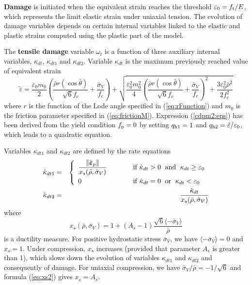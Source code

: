 \documentclass[a4paper]{article}
\begin{document}
{\bf Damage} is initiated when the equivalent strain reaches the threshold $\varepsilon_{0} = f_{\rm t}/E$,
which represents the limit elastic strain under uniaxial tension. 
The evolution of damage variables depends
on certain internal variables linked to the elastic and plastic strains
computed using the plastic part of the model.

The {\bf tensile damage} variable $\omega_t$ is a function of three auxiliary
internal variables, $\kappa_{dt}$, $\kappa_{dt1}$ and $\kappa_{dt2}$.
Variable $\kappa_{dt}$ is the maximum previously reached value of
equivalent strain
\begin{equation}\label{cdpm2:eps}
\tilde\varepsilon = \frac{\varepsilon_0m_0}{2}\left(\frac{\bar\rho r(\cos\bar\theta)}{\sqrt{6}f_c}+\frac{\bar\sigma_V}{f_c}\right) + \sqrt{\frac{\varepsilon_0^2m_0^2}{4}\left(\frac{\bar\rho r(\cos\bar\theta)}{\sqrt{6}f_c}+\frac{\bar\sigma_V}{f_c}\right)^2+\frac{3\varepsilon_0^2\bar\rho^2}{2f_c^2}}    
\end{equation}
where $r$ is the function of the Lode angle specified in (\ref{eq:rFunction}) and $m_0$ is the friction parameter specified in (\ref{eq:frictionM}).
Expression (\ref{cdpm2:eps}) has been derived from the yield condition $f_{\rm p} = 0$ by setting $q_{\rm {h1}}=1$ and $q_{\rm{h2}} = \tilde{\varepsilon}/\varepsilon_{0}$,
which leads to a quadratic equation.

Variables $\kappa_{dt1}$ and $\kappa_{dt2}$ are defined by the rate equations
\begin{eqnarray}
\dot\kappa_{dt1} &=& \left\{\begin{array}{ll}
\displaystyle\frac{\Vert\dot{\boldsymbol\varepsilon}_p\Vert}{x_s(\bar\rho,\bar\sigma_V)} & \hskip 10mm \mbox{if } \dot\kappa_{dt}>0\;\mbox{ and }\; \kappa_{dt}\ge \varepsilon_0
\\[3mm]
0 & \hskip 10mm \mbox{if } \dot\kappa_{dt}=0\;\mbox{ or }\; \kappa_{dt}< \varepsilon_0
\end{array}\right.
\\
\dot\kappa_{dt2} &=&  \frac{\dot\kappa_{dt}}{x_s(\bar\rho,\bar\sigma_V)}
\end{eqnarray}
where 
\begin{equation}\label{eq:xs2}
    x_s(\bar\rho,\bar\sigma_V) =
    1+(A_s-1)\frac{\sqrt{6}\langle-\bar\sigma_V\rangle}{\bar\rho}
\end{equation}
is a ductility measure. For positive hydrostatic stress $\bar\sigma_V$,
we have $\langle-\bar\sigma_V\rangle=0$ and $x_s=1$. Under compression,
$x_s$ increases (provided that parameter $A_s$ is greater than 1),
which slows down the evolution of variables $\kappa_{dt1}$ and $\kappa_{dt2}$
and consequently of damage. For uniaxial compression, we have
$\bar\sigma_V/\bar\rho=-1/\sqrt{6}$ and formula (\ref{eq:xs2}) gives $x_s=A_s$.
\end{document}
